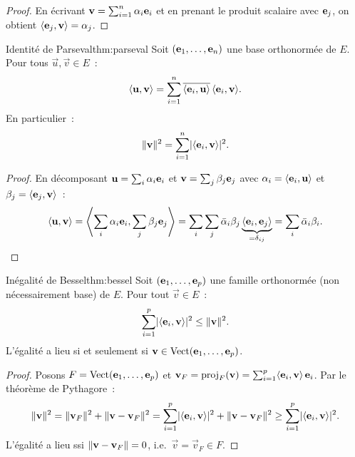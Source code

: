 \begin{proof}
  En écrivant $\vec{v}=\sum_{i=1}^n\alpha_i\vece{i}$ et en prenant le
  produit scalaire avec $\vece{j}$, on obtient
  $\inner{\vece{j},\vec{v}}=\alpha_j$.
\end{proof}

\begin{theorem}{Identité de Parseval}{thm:parseval}
  Soit $(\vece{1},\ldots,\vece{n})$ une base orthonormée de $E$.
  Pour tous $\vec{u},\vec{v}\in E$~:
  \[
    \inner{\vec{u},\vec{v}}
    =\sum_{i=1}^n\overline{\inner{\vece{i},\vec{u}}}\,
    \inner{\vece{i},\vec{v}}.
  \]
  En particulier~:
  \[
    \norm{\vec{v}}^2=\sum_{i=1}^n\abs{\inner{\vece{i},\vec{v}}}^2.
  \]
\end{theorem}

\begin{proof}
  En décomposant $\vec{u}=\sum_i\alpha_i\vece{i}$ et
  $\vec{v}=\sum_j\beta_j\vece{j}$ avec
  $\alpha_i=\inner{\vece{i},\vec{u}}$ et
  $\beta_j=\inner{\vece{j},\vec{v}}$~:
  \[
    \inner{\vec{u},\vec{v}}
    =\inner*{\sum_i\alpha_i\vece{i},\sum_j\beta_j\vece{j}}
    =\sum_i\sum_j\bar{\alpha}_i\beta_j
    \underbrace{\inner{\vece{i},\vece{j}}}_{=\delta_{ij}}
    =\sum_i\bar{\alpha}_i\beta_i.
    \qedhere
  \]
\end{proof}

\begin{theorem}{Inégalité de Bessel}{thm:bessel}
  Soit $(\vece{1},\ldots,\vece{p})$ une famille orthonormée (non
  nécessairement base) de $E$. Pour tout $\vec{v}\in E$~:
  \[
    \sum_{i=1}^p\abs{\inner{\vece{i},\vec{v}}}^2
    \leq\norm{\vec{v}}^2.
  \]
  L'égalité a lieu si et seulement si $\vec{v}\in\Vect(\vece{1},
  \ldots,\vece{p})$.
\end{theorem}

\begin{proof}
  Posons $F=\Vect(\vece{1},\ldots,\vece{p})$ et
  $\vec{v}_F=\proj_F(\vec{v})=\sum_{i=1}^p\inner{\vece{i},\vec{v}}
  \,\vece{i}$. Par le théorème de Pythagore~:
  \[
    \norm{\vec{v}}^2=\norm{\vec{v}_F}^2+\norm{\vec{v}-\vec{v}_F}^2
    =\sum_{i=1}^p\abs{\inner{\vece{i},\vec{v}}}^2
    +\norm{\vec{v}-\vec{v}_F}^2
    \geq\sum_{i=1}^p\abs{\inner{\vece{i},\vec{v}}}^2.
  \]
  L'égalité a lieu ssi $\norm{\vec{v}-\vec{v}_F}=0$, i.e.\
  $\vec{v}=\vec{v}_F\in F$.
\end{proof}

